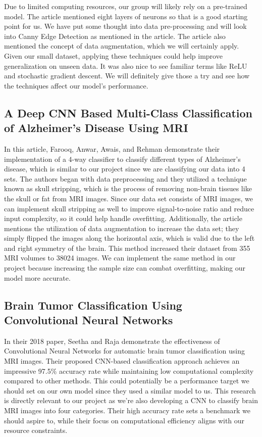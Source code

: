 \documentclass[conference]{IEEEtran}
\begin{document}
Due to limited computing resources, our group will likely rely on a pre-trained model. The article mentioned eight layers of neurons so that is a good starting point for us. We have put some thought into data pre-processing and will look into Canny Edge Detection as mentioned in the article. The article also mentioned the concept of data augmentation, which we will certainly apply. Given our small dataset, applying these techniques could help improve generalization on unseen data. It was also nice to see familiar terms like ReLU and stochastic gradient descent. We will definitely give those a try and see how the techniques affect our model's performance.

\subsection{A Deep CNN Based Multi-Class Classification of Alzheimer's Disease Using MRI}

In this article, Farooq, Anwar, Awais, and Rehman demonstrate their implementation of a 4-way classifier to classify different types of Alzheimer's disease, which is similar to our project since we are classifying our data into 4 sets. The authors began with data preprocessing and they utilized a technique known as skull stripping, which is the process of removing non-brain tissues like the skull or fat from MRI images. Since our data set consists of MRI images, we can implement skull stripping as well to improve signal-to-noise ratio and reduce input complexity, so it could help handle overfitting. Additionally, the article mentions the utilization of data augmentation to increase the data set; they simply flipped the images along the horizontal axis, which is valid due to the left and right symmetry of the brain. This method increased their dataset from 355 MRI volumes to 38024 images. We can implement the same method in our project because increasing the sample size can combat overfitting, making our model more accurate.

\subsection{Brain Tumor Classification Using Convolutional Neural Networks}

In their 2018 paper, Seetha and Raja demonstrate the effectiveness of Convolutional Neural Networks for automatic brain tumor classification using MRI images. Their proposed CNN-based classification approach achieves an impressive 97.5\% accuracy rate while maintaining low computational complexity compared to other methods. This could potentially be a performance target we should set on our own model since they used a similar model to us. This research is directly relevant to our project as we're also developing a CNN to classify brain MRI images into four categories. Their high accuracy rate sets a benchmark we should aspire to, while their focus on computational efficiency aligns with our resource constraints. 
\end{document}
